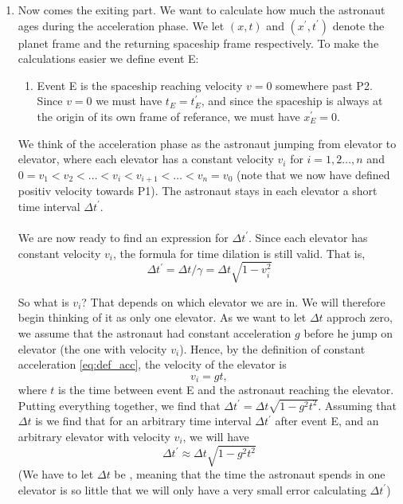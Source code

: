 \documentclass[a4paper,10pt,english]{article}
\begin{document}
\begin{enumerate}
\begin{enumerate}
\item Now comes the exiting part. We want to calculate how much the astronaut ages during the acceleration phase. We let $(x,t)$ and $(x^{\prime},t^{\prime})$ denote the planet frame and the returning spaceship frame respectively. To make the calculations easier we define event E:

\begin{enumerate} %
\item Event E is the spaceship reaching velocity $v=0$ somewhere past P2. Since $v=0$ we must have $t_{E}=t_{E}^{\prime}$, and since the spaceship is always at the origin of its own frame of referance, we must have $x_{E}^{\prime}=0$.
\end{enumerate} %

We think of the acceleration phase as the astronaut jumping from elevator to elevator, where each elevator has a constant velocity $v_{i}$ for $i=1,2\ldots,n$ and $0=v_{1}<v_{2}<\ldots<v_{i}<v_{i+1}<\ldots<v_{n}=v_{0}$ (note that we now have defined positiv velocity towards P1). The astronaut stays in each elevator a short time interval $\Delta t^{\prime}$. 
\\ \\
We are now ready to find an expression for $\Delta t^{\prime}$. Since each elevator has constant velocity $v_{i}$, the formula for time dilation is still valid. That is, 
\[\Delta t^{\prime}=\Delta t/\gamma=\Delta t\sqrt{1-v_{i}^{2}}\]

So what is $v_{i}$? That depends on which elevator we are in. We will therefore begin thinking of it as only one elevator. As we want to let $\Delta t$ approch zero, we assume that the astronaut had constant acceleration $g$ before he jump on  elevator (the one with velocity $v_{i}$). Hence, by the definition of constant acceleration \ref{eq:def_acc}, the velocity of the elevator is \[v_{i}=gt,\] where $t$ is the time between event E and the astronaut reaching the elevator.
\\
Putting everything together, we find that $\Delta t^{\prime}=\Delta t\sqrt{1-g^{2}t^{2}}$. Assuming that $\Delta t$ is  we find that for an arbitrary time interval $\Delta t^{\prime}$ after event E, and an arbitrary elevator with velocity $v_{i}$, we will have \begin{equation}\label{eq:new_time}\Delta t^{\prime}\approx\Delta t\sqrt{1-g^{2}t^{2}}\end{equation}
(We have to let $\Delta t$ be , meaning that the time the astronaut spends in one elevator is so little that we will only have a very small error calculating $\Delta t^{\prime}$)



\end{enumerate}
\end{enumerate}
\end{document}
